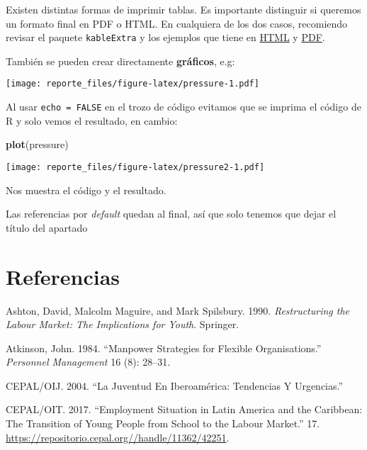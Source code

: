 \documentclass[]{article}
\newenvironment{Shaded}{\begin{snugshade}}{\end{snugshade}}
\newcommand{\KeywordTok}[1]{\textcolor[rgb]{0.13,0.29,0.53}{\textbf{#1}}}
\newcommand{\NormalTok}[1]{#1}
\begin{document}
Existen distintas formas de imprimir tablas. Es importante distinguir si
queremos un formato final en PDF o HTML. En cualquiera de los dos casos,
recomiendo revisar el paquete \texttt{kableExtra} y los ejemplos que
tiene en
\href{https://haozhu233.github.io/kableExtra/awesome_table_in_html.html}{HTML}
y
\href{https://haozhu233.github.io/kableExtra/awesome_table_in_pdf.pdf}{PDF}.

También se pueden crear directamente \textbf{gráficos}, e.g:

\texttt{[image: reporte\_files/figure-latex/pressure-1.pdf]}

Al usar \texttt{echo\ =\ FALSE} en el trozo de código evitamos que se
imprima el código de R y solo vemos el resultado, en cambio:

\begin{Shaded}
\begin{Highlighting}[]
\KeywordTok{plot}\NormalTok{(pressure)}
\end{Highlighting}
\end{Shaded}

\texttt{[image: reporte\_files/figure-latex/pressure2-1.pdf]}

Nos muestra el código y el resultado.

Las referencias por \emph{default} quedan al final, así que solo tenemos
que dejar el título del apartado

\hypertarget{referencias}{%
\section*{Referencias}\label{referencias}}

\hypertarget{refs}{}
\leavevmode\hypertarget{ref-ashton_restructuring_1990}{}%
Ashton, David, Malcolm Maguire, and Mark Spilsbury. 1990.
\emph{Restructuring the Labour Market: The Implications for Youth}.
Springer.

\leavevmode\hypertarget{ref-atkinson_manpower_1984}{}%
Atkinson, John. 1984. ``Manpower Strategies for Flexible
Organisations.'' \emph{Personnel Management} 16 (8): 28--31.

\leavevmode\hypertarget{ref-cepaloij_juventud_2004}{}%
CEPAL/OIJ. 2004. ``La Juventud En Iberoamérica: Tendencias Y
Urgencias.''

\leavevmode\hypertarget{ref-cepaloit_employment_2017}{}%
CEPAL/OIT. 2017. ``Employment Situation in Latin America and the
Caribbean: The Transition of Young People from School to the Labour
Market.'' 17. \url{https://repositorio.cepal.org//handle/11362/42251}.
\end{document}
